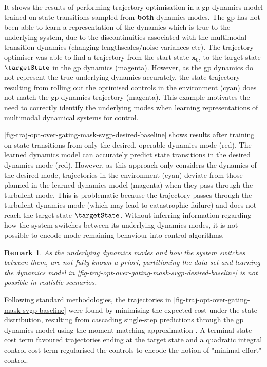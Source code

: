\documentclass{mimosis-class/mimosis}
\newtheorem*{remark}{Remark}
\numberwithin{equation}{chapter}
\newcommand{\state}{\ensuremath{\mathbf{x}}}
\begin{document}
It shows the results of performing trajectory optimisation in a \acrshort{gp} dynamics model trained on state
transitions sampled from \textbf{both} dynamics modes.
The \acrshort{gp} has not been able to learn a representation of the dynamics which is true to the underlying system,
due to the discontinuities associated with the multimodal transition dynamics (changing lengthscales/noise variances etc).
The trajectory optimiser was able to find a trajectory from the start state \(\state_0\),
to the target state \(\targetState\) in the \acrshort{gp} dynamics (magenta).
However, as the \acrshort{gp} dynamics do not represent the true underlying dynamics accurately,
the state trajectory resulting from rolling out the optimised controls in the environment (cyan) does not match
the \acrshort{gp} dynamics trajectory (magenta).
This example motivates the need to correctly identify the underlying modes when learning representations of
multimodal dynamical systems for control.

\cref{fig-traj-opt-over-gating-mask-svgp-desired-baseline} shows results after training on state transitions from
only the desired, operable dynamics mode (red).
The learned dynamics model can accurately predict state transitions in the desired dynamics mode (red).
However, as this approach only considers the dynamics of the desired mode,
trajectories in the environment (cyan) deviate from those planned in the
learned dynamics model (magenta) when they pass through the turbulent mode.
This is problematic because the trajectory passes through the turbulent dynamics mode
(which may lead to catastrophic failure) and does not reach the target state \(\targetState\).
Without inferring information regarding how the system switches between its underlying dynamics modes, it is not
possible to encode mode remaining behaviour into control algorithms.
\begin{remark}
As the underlying dynamics modes and how the system switches between them,
are \textit{not fully known a priori}, partitioning the data set and learning the dynamics model in
\cref{fig-traj-opt-over-gating-mask-svgp-desired-baseline} is not possible in realistic scenarios.
\end{remark}


\begin{myquote}
Following standard methodologies, the trajectories in \cref{fig-traj-opt-over-gating-mask-svgp-baseline}
were found by minimising the expected cost
under the state distribution, resulting from cascading single-step predictions through the \acrshort{gp} dynamics model
using the moment matching approximation \citep{kussGaussian2006}.
A terminal state cost term favoured trajectories ending at the target state and
a quadratic integral control cost term regularised the controls to encode the notion of
"minimal effort" control.
\end{myquote}
\end{document}
